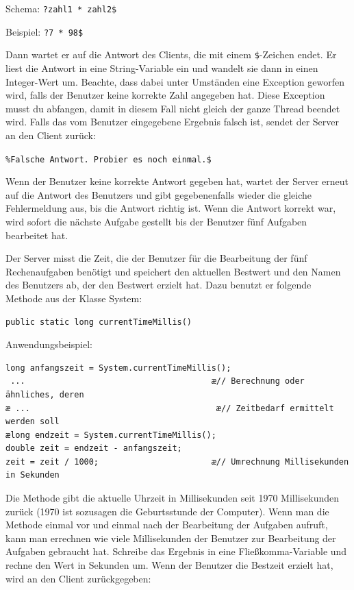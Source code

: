 Schema: \lstinline|?zahl1 * zahl2$|	

Beispiel: \lstinline|?7 * 98$|

Dann wartet er auf die Antwort des Clients, die mit einem \lstinline|$|-Zeichen
endet. Er liest die Antwort in eine String-Variable ein und wandelt sie dann in
einen Integer-Wert um. Beachte, dass dabei unter Umständen eine Exception
geworfen wird, falls der Benutzer keine korrekte Zahl angegeben hat. Diese
Exception musst du abfangen, damit in diesem Fall nicht gleich der ganze
Thread beendet wird. Falls das vom Benutzer eingegebene Ergebnis falsch ist,
sendet der Server an den Client zurück:

\lstinline|%Falsche Antwort. Probier es noch einmal.$|

Wenn der Benutzer keine korrekte Antwort gegeben hat, wartet der Server erneut
auf die Antwort des Benutzers und gibt gegebenenfalls wieder die gleiche
Fehlermeldung aus, bis die Antwort richtig ist. Wenn die Antwort korrekt war,
wird sofort die nächste Aufgabe gestellt bis der Benutzer fünf Aufgaben
bearbeitet hat.

Der Server misst die Zeit, die der Benutzer für die Bearbeitung der fünf
Rechenaufgaben benötigt und speichert den aktuellen Bestwert und den Namen des
Benutzers ab, der den Bestwert erzielt hat. Dazu benutzt er folgende Methode
aus der Klasse System:

\begin{lstlisting}
public static long currentTimeMillis()
\end{lstlisting}

Anwendungsbeispiel:

\begin{lstlisting}
long anfangszeit = System.currentTimeMillis();
 ...                                      æ// Berechnung oder ähnliches, deren
æ ...                                      æ// Zeitbedarf ermittelt werden soll
ælong endzeit = System.currentTimeMillis();
double zeit = endzeit - anfangszeit;
zeit = zeit / 1000;                       æ// Umrechnung Millisekunden in Sekunden
\end{lstlisting}

Die Methode gibt die aktuelle Uhrzeit in Millisekunden seit 1970 Millisekunden
zurück (1970 ist sozusagen die Geburtsstunde der Computer). Wenn man die
Methode einmal vor und einmal nach der Bearbeitung der Aufgaben aufruft, kann
man errechnen wie viele Millisekunden der Benutzer zur Bearbeitung der Aufgaben
gebraucht hat. Schreibe das Ergebnis in eine Fließkomma-Variable und rechne den
Wert in Sekunden um. Wenn der Benutzer die Bestzeit erzielt hat, wird an den
Client zurückgegeben:

